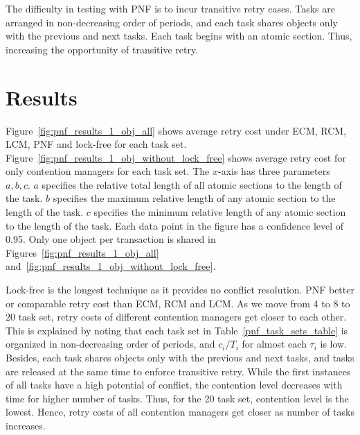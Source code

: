 \documentclass[12pt,english]{report}
\begin{document}
The difficulty in testing with PNF is to incur transitive retry cases. Tasks are arranged in non-decreasing order of periods, and each task shares objects only with the previous and next tasks. Each task begins with an atomic section. Thus, increasing the opportunity of transitive retry.



\section{Results}\label{sec:final_results}

Figure~\ref{fig:pnf_results_1_obj_all} shows average retry cost under ECM, RCM, LCM, PNF and lock-free for each task set. Figure~\ref{fig:pnf_results_1_obj_without_lock_free} shows average retry cost for only contention managers for each task set. The $x$-axis has three parameters $a,b,c$. $a$ specifies the relative total length of all atomic sections to the length of the task. $b$ specifies the maximum relative length of any atomic section to the length of the task. $c$ specifies the minimum relative length of any atomic section to the length of the task. Each data point in the figure has a confidence level of 0.95.
Only one object per transaction is shared in Figures~\ref{fig:pnf_results_1_obj_all} and~\ref{fig:pnf_results_1_obj_without_lock_free}.

Lock-free is the longest technique as it provides no conflict resolution. PNF better or comparable retry cost than ECM, RCM and LCM. As we move from 4 to 8 to 20 task set, retry costs of different contention managers get closer to each other. This is explained by noting that each task set in Table~\ref{pnf_task_sets_table} is organized in non-decreasing order of periods, and $c_i/T_i$ for almost each $\tau_i$ is low. Besides, each task shares objects only with the previous and next tasks, and tasks are released at the same time to enforce transitive retry. While the first instances of all tasks have a high potential of conflict, the contention level decreases with time for higher number of tasks. Thus, for the 20 task set, contention level is the lowest. Hence, retry costs of all contention managers get closer as number of tasks increases.
\end{document}

